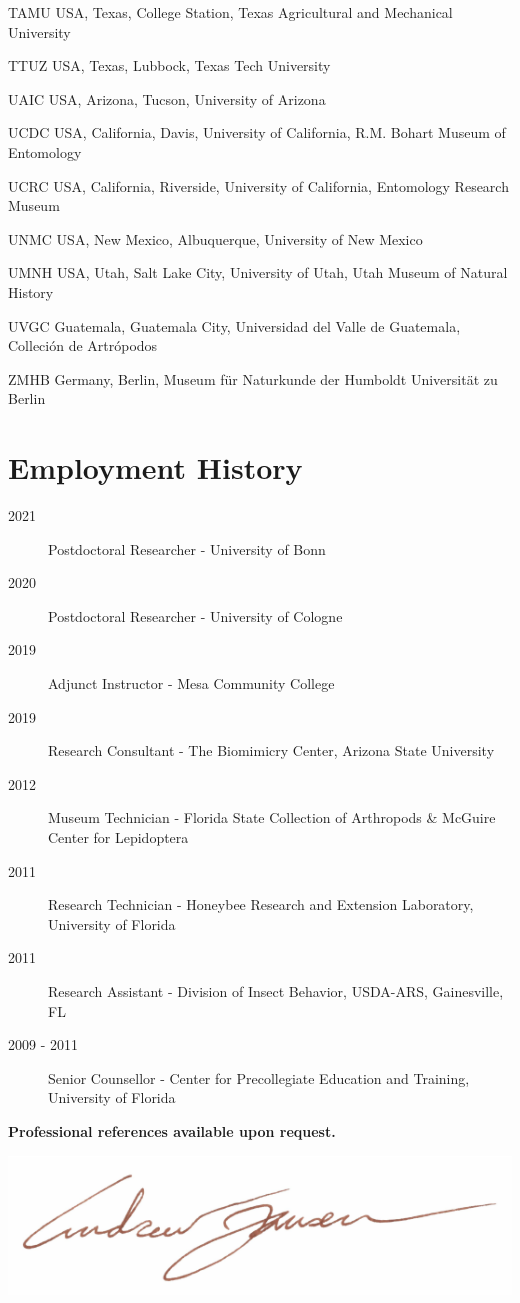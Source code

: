\documentclass[12pt,a4paper]{article}
\begin{document}
\begin{collections}
			\item [TAMU] USA, Texas, College Station, Texas Agricultural and Mechanical University
			\item [TTUZ] USA, Texas, Lubbock, Texas Tech University
			\item [UAIC] USA, Arizona, Tucson, University of Arizona
			\item [UCDC] USA, California, Davis, University of California, R.M. Bohart Museum of Entomology
			\item [UCRC] USA, California, Riverside, University of California, Entomology Research Museum
			\item [UNMC] USA, New Mexico, Albuquerque, University of New Mexico
			\item [UMNH] USA, Utah, Salt Lake City, University of Utah, Utah Museum of Natural History
			\item [UVGC] Guatemala, Guatemala City, Universidad del Valle de Guatemala, Colleci\'{o}n de Artr\'{o}podos
			\item [ZMHB] Germany, Berlin, Museum f\"{u}r Naturkunde der Humboldt Universit\"{a}t zu Berlin
		\end{collections}

\section*{Employment History}
	\begin{description}
		\item [2021] Postdoctoral Researcher - University of Bonn
		\item [2020] Postdoctoral Researcher - University of Cologne
		\item [2019] Adjunct Instructor - Mesa Community College
		\item [2019] Research Consultant - The Biomimicry Center, Arizona State University
		\item [2012] Museum Technician - Florida State Collection of Arthropods \& McGuire Center for Lepidoptera
		\item [2011] Research Technician - Honeybee Research and Extension Laboratory, University of Florida
		\item [2011] Research Assistant - Division of Insect Behavior, USDA-ARS, Gainesville, FL
		\item [2009 - 2011] Senior Counsellor - Center for Precollegiate Education and Training, University of Florida
	\end{description}

\vspace{1cm}

\noindent\large{\textbf{Professional references available upon request.}}

\vspace*{1cm}
\includegraphics[scale=1]{signature.pdf}\\
\end{document}
